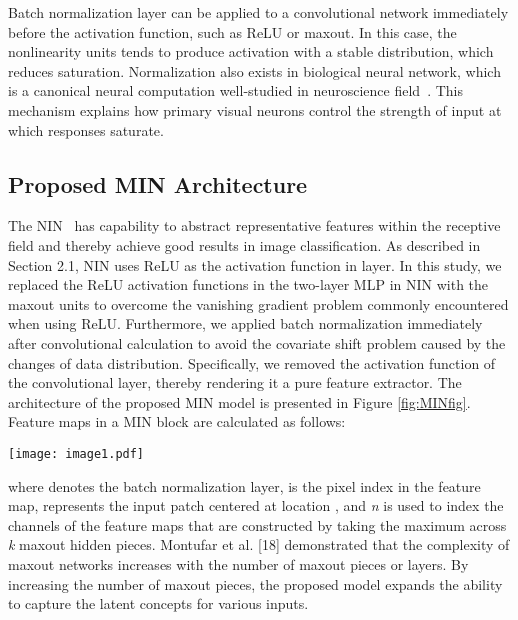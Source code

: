\documentclass[10pt,twocolumn,letterpaper]{article}
\begin{document}
Batch normalization layer can be applied to a convolutional network immediately before the activation function, such as ReLU or maxout.
In this case, the nonlinearity units tends to produce activation with a stable distribution, which reduces saturation.
Normalization also exists in biological neural network, which is a canonical neural computation well-studied in neuroscience field~\cite{carandini2012normalization}.
This mechanism explains how primary visual neurons control the strength of input at which responses saturate.

\subsection{Proposed MIN Architecture}



The NIN~\cite{DBLP:journals/corr/LinCY13} has capability to abstract representative features within the receptive field and thereby achieve good results in image classification. As described in Section 2.1, NIN uses ReLU as the activation function in  layer. In this study, we replaced the ReLU activation functions in the two-layer MLP in NIN with the maxout units to overcome the vanishing gradient problem commonly encountered when using ReLU. Furthermore, we applied batch normalization immediately after convolutional calculation to avoid the covariate shift problem caused by the changes of data distribution. Specifically, we removed the activation function of the convolutional layer, thereby rendering it a pure feature extractor. The architecture of the proposed MIN model is presented in Figure \ref{fig:MINfig}.  Feature maps in a MIN block are calculated as follows:

\begin{figure*}
\begin{center}
	\texttt{[image: image1.pdf]}
\end{center}
   \caption{The architecture of the proposed MIN model.}
\label{fig:MINfig}
\end{figure*}

 
 

where  denotes the batch normalization layer,  is the pixel index in the feature map,  represents the input patch centered at location , and \textit{n} is used to index the channels of the feature maps that are constructed by taking the maximum across \textit{k} maxout hidden pieces. Montufar et al. [18] demonstrated that the complexity of maxout networks increases with the number of maxout pieces or layers. By increasing the number of maxout pieces, the proposed model expands the ability to capture the latent concepts for various inputs.
\end{document}
